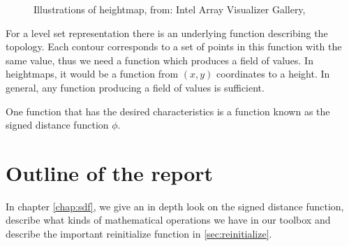 \begin{figure}[h]
\begin{center}
\end{center}
\caption{Illustrations of heightmap, from: Intel Array Visualizer
  Gallery, }
\label{fig:heightmap}
\end{figure}


For a level set representation there is an underlying function
describing the topology. Each contour corresponds to a set of points
in this function with the same value, thus we need a function which
produces a field of values. In heightmaps, it would be a function from
$(x,y)$ coordinates to a height. In general, any function producing a
field of values is sufficient.  

One function that has the desired characteristics is a function known
as the signed distance function $\phi$.

\section*{Outline of the report}

In chapter \vref{chap:sdf}, we give an in depth look on the signed
distance function, describe what kinds of mathematical operations we
have in our toolbox and describe the important reinitialize function in \vref{sec:reinitialize}.

